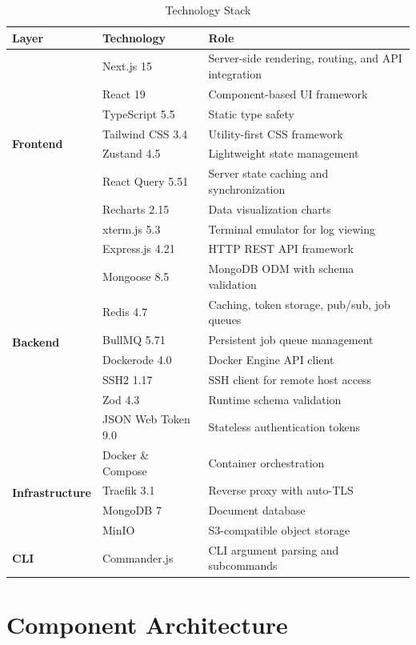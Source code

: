 \documentclass[12pt,a4paper,twoside]{report}
\begin{document}
\begin{table}[H]
\centering
\caption{Technology Stack}
\label{tab:techstack}
\begin{tabularx}{\textwidth}{l|l|X}
\toprule
\textbf{Layer} & \textbf{Technology} & \textbf{Role} \\
\midrule
\multirow{8}{*}{\textbf{Frontend}} & Next.js 15 & Server-side rendering, routing, and API integration \\
& React 19 & Component-based UI framework \\
& TypeScript 5.5 & Static type safety \\
& Tailwind CSS 3.4 & Utility-first CSS framework \\
& Zustand 4.5 & Lightweight state management \\
& React Query 5.51 & Server state caching and synchronization \\
& Recharts 2.15 & Data visualization charts \\
& xterm.js 5.3 & Terminal emulator for log viewing \\
\midrule
\multirow{8}{*}{\textbf{Backend}} & Express.js 4.21 & HTTP REST API framework \\
& Mongoose 8.5 & MongoDB ODM with schema validation \\
& Redis 4.7 & Caching, token storage, pub/sub, job queues \\
& BullMQ 5.71 & Persistent job queue management \\
& Dockerode 4.0 & Docker Engine API client \\
& SSH2 1.17 & SSH client for remote host access \\
& Zod 4.3 & Runtime schema validation \\
& JSON Web Token 9.0 & Stateless authentication tokens \\
\midrule
\multirow{4}{*}{\textbf{Infrastructure}} & Docker \& Compose & Container orchestration \\
& Traefik 3.1 & Reverse proxy with auto-TLS \\
& MongoDB 7 & Document database \\
& MinIO & S3-compatible object storage \\
\midrule
\textbf{CLI} & Commander.js & CLI argument parsing and subcommands \\
\bottomrule
\end{tabularx}
\end{table}

\section{Component Architecture}
\end{document}
